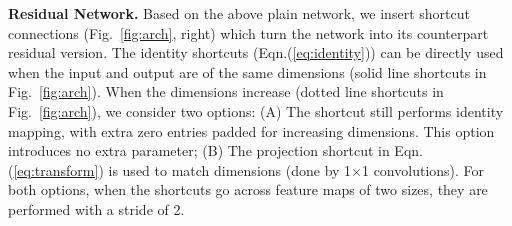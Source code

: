 \vspace{6pt}
\noindent\textbf{Residual Network.}
Based on the above plain network, we insert shortcut connections (Fig.~\ref{fig:arch}, right) which turn the network into its counterpart residual version.
The identity shortcuts (Eqn.(\ref{eq:identity})) can be directly used when the input and output are of the same dimensions (solid line shortcuts in Fig.~\ref{fig:arch}).
When the dimensions increase (dotted line shortcuts in Fig.~\ref{fig:arch}), we consider two options:
(A) The shortcut still performs identity mapping, with extra zero entries padded for increasing dimensions. This option introduces no extra parameter;
(B) The projection shortcut in Eqn.(\ref{eq:transform}) is used to match dimensions (done by 1$\times$1 convolutions).
For both options, when the shortcuts go across feature maps of two sizes, they are performed with a stride of 2.

